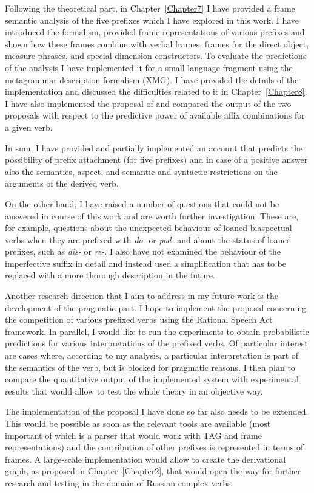 Following the theoretical part,  in Chapter~\ref{Chapter7} I have provided a frame semantic analysis of the five prefixes which I have explored in this work. I have introduced the formalism, provided frame representations of various prefixes and shown how these frames combine with verbal frames, frames for the direct object, measure phrases, and special dimension constructors. To evaluate the predictions of the analysis I have implemented it for a small language fragment using the metagrammar description formalism (XMG). I have provided the details of the implementation and discussed the difficulties related to it in Chapter~\ref{Chapter8}. I have also implemented the proposal of \citet{Tatevosov:09} and compared the output of the two proposals with respect to the predictive power of available affix combinations for a given verb. 

In sum, I have provided and partially implemented an account that predicts the possibility of prefix attachment (for five prefixes) and in case of a positive answer also the semantics, aspect, and semantic and syntactic restrictions on the arguments of the derived verb. 

On the other hand, I have raised a number of questions that could not be answered in course of this work and are worth further investigation. These are, for example, questions about the unexpected behaviour of loaned biaspectual verbs when they are prefixed with \textit{do-} or \textit{pod-} and about the status of loaned prefixes, such as \textit{dis-} or \textit{re-}. I also have not examined the behaviour of the imperfective suffix in detail and instead used a simplification that has to be replaced with a more thorough description in the future. 

Another research direction that I aim to address in my future work is the development of the pragmatic part. I hope to implement the proposal concerning the competition of various prefixed verbs using the Rational Speech Act framework. In parallel, I would like to run the experiments to obtain probabilistic predictions for various interpretations of the prefixed verbs.  Of particular interest are cases where, according to my analysis, a particular interpretation is part of the semantics of the verb, but is blocked for pragmatic reasons. I then plan to compare the quantitative output of the implemented system with experimental results that would allow to test the whole theory in an objective way.

The implementation of the proposal I have done so far also needs to be extended. This would be possible as soon as the relevant tools are available (most important of which is a parser that would work with TAG and frame representations) and the contribution of other prefixes is represented in terms of frames. A large-scale implementation would allow to create the derivational graph, as proposed in Chapter~\ref{Chapter2}, that would open the way for further research and testing in the domain of Russian complex verbs. 